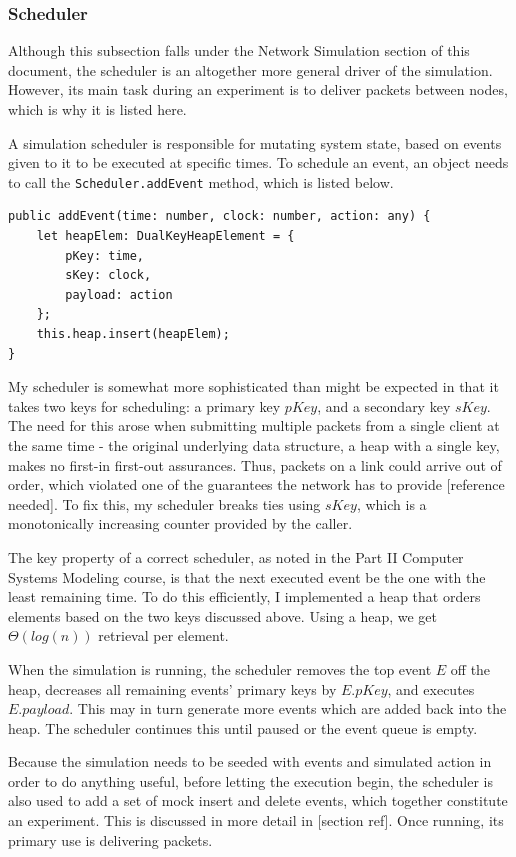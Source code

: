 \documentclass[12pt,a4paper,twoside,openright]{report}
\begin{document}
		
		\subsubsection{Scheduler}
		Although this subsection falls under the Network Simulation section of this document, the scheduler is an altogether more general driver of the simulation. However, its main task during an experiment is to deliver packets between nodes, which is why it is listed here.
		
		A simulation scheduler is responsible for mutating system state, based on events given to it to be executed at specific times. To schedule an event, an object needs to call the \lstinline|Scheduler.addEvent| method, which is listed below.
\begin{lstlisting}[caption=The Scheduler.addEvent method]
public addEvent(time: number, clock: number, action: any) {
    let heapElem: DualKeyHeapElement = {
        pKey: time,
        sKey: clock,
        payload: action
    };
    this.heap.insert(heapElem);
}
\end{lstlisting}

		My scheduler is somewhat more sophisticated than might be expected in that it takes two keys for scheduling: a primary key $pKey$, and a secondary key $sKey$. The need for this arose when submitting multiple packets from a single client at the same time - the original underlying data structure, a heap with a single key, makes no first-in first-out assurances. Thus, packets on a link could arrive out of order, which violated one of the guarantees the network has to provide [reference needed]. To fix this, my scheduler breaks ties using $sKey$, which is a monotonically increasing counter provided by the caller.
		
		The key property of a correct scheduler, as noted in the Part II Computer Systems Modeling \cite[slide 120]{compsysmodeling} course, is that the next executed event be the one with the least remaining time. To do this efficiently, I implemented a heap that orders elements based on the two keys discussed above. Using a heap, we get $\Theta (log(n))$ retrieval per element.
		
		When the simulation is running, the scheduler removes the top event $E$ off the heap, decreases all remaining events' primary keys by $E.pKey$, and executes $E.payload$. This may in turn generate more events which are added back into the heap. The scheduler continues this until paused or the event queue is empty.
		
		Because the simulation needs to be seeded with events and simulated action in order to do anything useful, before letting the execution begin, the scheduler is also used to add a set of mock insert and delete events, which together constitute an experiment. This is discussed in more detail in [section ref]. Once running, its primary use is delivering packets.
		
\end{document}
